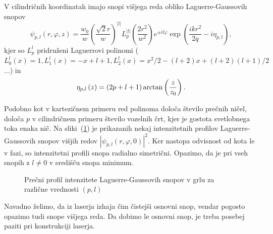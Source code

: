 V cilindričnih koordinatah imajo snopi višjega reda obliko Laguerre-Gaussovih 
snopov
\begin{equation}
\psi_{p,l}(r,\varphi,z)=\frac{w_{0}}{w}\left(\frac{\sqrt{2}r}{w}\right)^{|l|}
L_{p}^{|l|}\left(\frac{2r^{2}}{w^{2}}\right)e^{\pm il\varphi}\exp\left(\frac{ikr^{2}}{2q}-i\eta_{p,l}\right),
\label{eq:Gauss-Laguerrevi}
\end{equation}
kjer so $L_{p}^{l}$ pridruženi Laguerrovi polinomi ($L_{0}^{l}(x) = 1, 
L_{1}^{l}(x) = -x+l+1, 
L_{2}^{l}(x) = x^2/2-(l+2)x+(l+2)(l+1)/2
$ ...) in 
\begin{equation}\index{Gouyeva faza}
\eta_{p,l}\left(z\right)=(2p+l+1)\arctan\left(\frac{z}{z_{0}}\right).
\label{eq:etaGL}
\end{equation}

Podobno kot v kartezičnem primeru red polinoma določa število prečnih ničel,
določa $p$ v cilindričnem primeru število vozelnih črt, kjer je gostota 
svetlobnega toka enaka nič. Na sliki~(\ref{fig:Laguerrovi_presek})
je prikazanih nekaj intenzitetnih profilov Laguerre-Gaussovih snopov
višjih redov $|\psi_{p,l}(r, \varphi, 0)|^2$. Ker nastopa  odvisnost od kota
le v fazi, so intenzitetni profili snopa radialno simetrični. Opazimo, da je pri  
vseh snopih z $l \ne 0$ v središču snopa minimum. 
\begin{figure}[h]
\centering
\def\svgwidth{110truemm} 

\caption{Prečni profil intenzitete Laguerre-Gaussovih snopov v grlu 
za različne vrednosti $(p,l)$}
\label{fig:Laguerrovi_presek}
\end{figure}

Navadno želimo, da iz laserja izhaja čim čistejši osnovni snop, vendar
pogosto opazimo tudi snope višjega reda. Da dobimo le osnovni
snop, je treba posebej paziti pri konstrukciji laserja.


